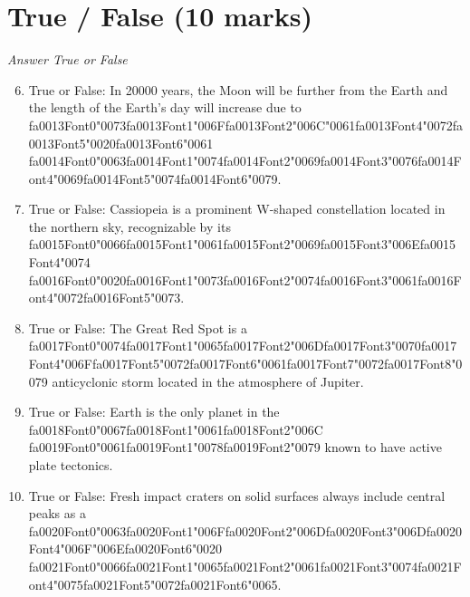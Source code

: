 \documentclass[12pt]{article}
\begin{document}
\section*{True / False (10 marks)}
\textit{Answer True or False}
\begin{enumerate}[label=\arabic*.]
\setcounter{enumi}{5}
\item True or False: In 20000 years, the Moon will be further from the Earth and the length of the Earth's day will increase due to {\csname fa0013Font0\endcsname\char"0073}{\csname fa0013Font1\endcsname\char"006F}{\csname fa0013Font2\endcsname\char"006C}{\char"0061}{\csname fa0013Font4\endcsname\char"0072}{\csname fa0013Font5\endcsname\char"0020}{\csname fa0013Font6\endcsname\char"0061} {\csname fa0014Font0\endcsname\char"0063}{\csname fa0014Font1\endcsname\char"0074}{\csname fa0014Font2\endcsname\char"0069}{\csname fa0014Font3\endcsname\char"0076}{\csname fa0014Font4\endcsname\char"0069}{\csname fa0014Font5\endcsname\char"0074}{\csname fa0014Font6\endcsname\char"0079}.
\item True or False: Cassiopeia is a prominent W-shaped constellation located in the northern sky, recognizable by its {\csname fa0015Font0\endcsname\char"0066}{\csname fa0015Font1\endcsname\char"0061}{\csname fa0015Font2\endcsname\char"0069}{\csname fa0015Font3\endcsname\char"006E}{\csname fa0015Font4\endcsname\char"0074} {\csname fa0016Font0\endcsname\char"0020}{\csname fa0016Font1\endcsname\char"0073}{\csname fa0016Font2\endcsname\char"0074}{\csname fa0016Font3\endcsname\char"0061}{\csname fa0016Font4\endcsname\char"0072}{\csname fa0016Font5\endcsname\char"0073}.
\item True or False: The Great Red Spot is a {\csname fa0017Font0\endcsname\char"0074}{\csname fa0017Font1\endcsname\char"0065}{\csname fa0017Font2\endcsname\char"006D}{\csname fa0017Font3\endcsname\char"0070}{\csname fa0017Font4\endcsname\char"006F}{\csname fa0017Font5\endcsname\char"0072}{\csname fa0017Font6\endcsname\char"0061}{\csname fa0017Font7\endcsname\char"0072}{\csname fa0017Font8\endcsname\char"0079} anticyclonic storm located in the atmosphere of Jupiter.
\item True or False: Earth is the only planet in the {\csname fa0018Font0\endcsname\char"0067}{\csname fa0018Font1\endcsname\char"0061}{\csname fa0018Font2\endcsname\char"006C} {\csname fa0019Font0\endcsname\char"0061}{\csname fa0019Font1\endcsname\char"0078}{\csname fa0019Font2\endcsname\char"0079} known to have active plate tectonics.
\item True or False: Fresh impact craters on solid surfaces always include central peaks as a {\csname fa0020Font0\endcsname\char"0063}{\csname fa0020Font1\endcsname\char"006F}{\csname fa0020Font2\endcsname\char"006D}{\csname fa0020Font3\endcsname\char"006D}{\csname fa0020Font4\endcsname\char"006F}{\char"006E}{\csname fa0020Font6\endcsname\char"0020} {\csname fa0021Font0\endcsname\char"0066}{\csname fa0021Font1\endcsname\char"0065}{\csname fa0021Font2\endcsname\char"0061}{\csname fa0021Font3\endcsname\char"0074}{\csname fa0021Font4\endcsname\char"0075}{\csname fa0021Font5\endcsname\char"0072}{\csname fa0021Font6\endcsname\char"0065}.
\end{enumerate}
\end{document}
